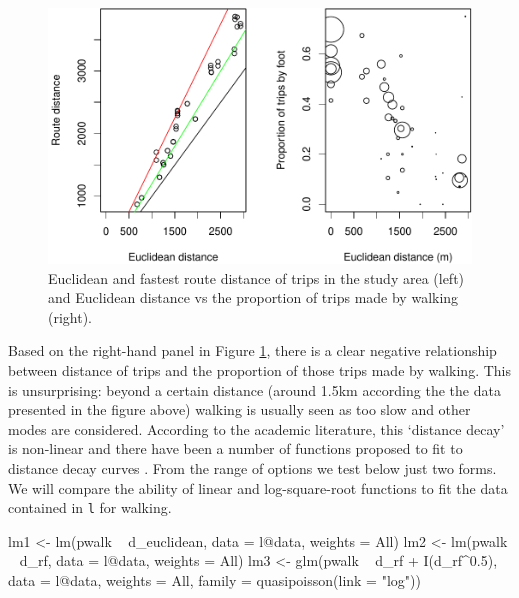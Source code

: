 \begin{Schunk}
\begin{figure}
\includegraphics[width=1\linewidth]{euclidfastest-1} \caption[Euclidean and fastest route distance of trips in the study area (left) and Euclidean distance vs the proportion of trips made by walking (right)]{Euclidean and fastest route distance of trips in the study area (left) and Euclidean distance vs the proportion of trips made by walking (right).}\label{fig:euclidfastest}
\end{figure}
\end{Schunk}

Based on the right-hand panel in Figure \ref{fig:euclidfastest}, there
is a clear negative relationship between distance of trips and the
proportion of those trips made by walking. This is unsurprising: beyond
a certain distance (around 1.5km according the the data presented in the
figure above) walking is usually seen as too slow and other modes are
considered. According to the academic literature, this `distance decay'
is non-linear and there have been a number of functions proposed to fit
to distance decay curves \citep{martinez_new_2013}. From the range of
options we test below just two forms. We will compare the ability of
linear and log-square-root functions to fit the data contained in
\texttt{l} for walking.

\begin{Schunk}
\begin{Sinput}
lm1 <- lm(pwalk ~ d_euclidean, data = l@data, weights = All)
lm2 <- lm(pwalk ~ d_rf, data = l@data, weights = All)
lm3 <- glm(pwalk ~ d_rf + I(d_rf^0.5),
           data = l@data, weights = All, family = quasipoisson(link = "log"))
\end{Sinput}
\end{Schunk}

